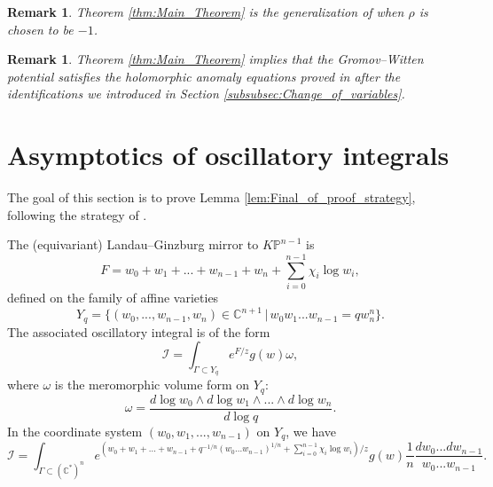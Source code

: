 \documentclass[12pt]{amsart}
\newtheorem{rem}[prop]{Remark}
\numberwithin{equation}{section}
\begin{document}
\begin{rem}
Theorem \ref{thm:Main_Theorem} is the generalization of \cite[Theorem 4']{lho-p2} when $\rho$ is chosen to be $-1$.
\end{rem}

\begin{rem}
Theorem \ref{thm:Main_Theorem} implies that the Gromov--Witten potential satisfies the holomorphic anomaly equations proved in \cite{gt} after the identifications we introduced in Section \ref{subsubsec:Change_of_variables}.
\end{rem}


\section{Asymptotics of oscillatory integrals} \label{sec:asymptotics_of_oscillatory_integrals}
The goal of this section is to prove Lemma \ref{lem:Final_of_proof_strategy}, following the strategy of \cite[Appendix]{lho-p2}.


The (equivariant) Landau--Ginzburg mirror to $K\mathbb{P}^{n-1}$ is 
\begin{equation*}
    F=w_0+w_1+...+w_{n-1}+w_n+\sum_{i=0}^{n-1}\chi_i \log w_i,
\end{equation*}
defined on the family of affine varieties
\begin{equation*}
    Y_q=\{(w_0,...,w_{n-1}, w_n)\in \mathbb{C}^{n+1} \,|\, w_0w_1...w_{n-1}=qw_n^n\}.
\end{equation*}
The associated oscillatory integral is of the form
\begin{equation}\label{eqn:oscillatory_int}
\mathcal{I}=\int_{\Gamma\subset Y_q} e^{F/z}g(w)\omega,    
\end{equation}
where $\omega$ is the meromorphic volume form on $Y_q$:
\begin{equation*}
\omega=\frac{d\log w_0\wedge d\log w_1\wedge...\wedge d\log w_n}{d\log q}.    
\end{equation*}
In the coordinate system $(w_0,w_1,...,w_{n-1})$ on $Y_q$, we have 
\begin{equation*}
\mathcal{I}=\int_{\Gamma\subset (\mathbb{C}^*)^n} e^{(w_0+w_1+...+w_{n-1}+q^{-1/n}(w_0...w_{n-1})^{1/n}+\sum_{i=0}^{n-1}\chi_i \log w_i)/z}g(w)\frac{1}{n}\frac{dw_0...dw_{n-1}}{w_0...w_{n-1}}.    
\end{equation*}
\end{document}
